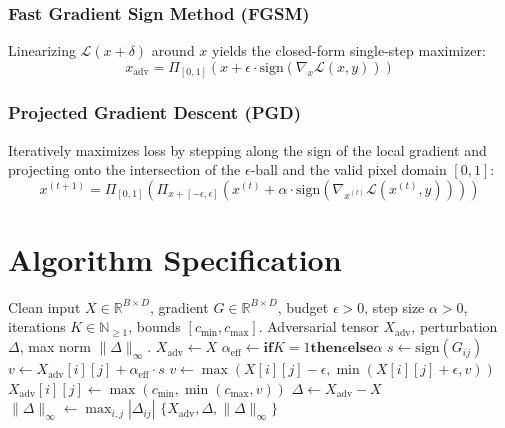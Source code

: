 \documentclass[11pt,a4paper]{article}
\theoremstyle{definition}
\begin{document}
\subsubsection{Fast Gradient Sign Method (FGSM)}
Linearizing $\mathcal{L}(x + \delta)$ around $x$ yields the closed-form single-step maximizer:
\begin{equation}
x_{\text{adv}} = \Pi_{[0, 1]} \left( x + \epsilon \cdot \text{sign}(\nabla_x \mathcal{L}(x, y)) \right)
\end{equation}

\subsubsection{Projected Gradient Descent (PGD)}
Iteratively maximizes loss by stepping along the sign of the local gradient and projecting onto the intersection of the $\epsilon$-ball and the valid pixel domain $[0, 1]$:
\begin{equation}
x^{(t+1)} = \Pi_{[0, 1]} \left( \Pi_{x + [-\epsilon, \epsilon]} \left( x^{(t)} + \alpha \cdot \text{sign}(\nabla_{x^{(t)}} \mathcal{L}(x^{(t)}, y)) \right) \right)
\end{equation}

\section{Algorithm Specification}

\begin{algorithm}[H]
\caption{Iterative Projected Gradient Descent (PGD / FGSM)}
\label{alg:pgd_fgsm}
\begin{algorithmic}[1]
\Require Clean input $X \in \mathbb{R}^{B \times D}$, gradient $G \in \mathbb{R}^{B \times D}$, budget $\epsilon > 0$, step size $\alpha > 0$, iterations $K \in \mathbb{N}_{\ge 1}$, bounds $[c_{\text{min}}, c_{\text{max}}]$.
\Ensure Adversarial tensor $X_{\text{adv}}$, perturbation $\Delta$, max norm $\|\Delta\|_\infty$.
\State $X_{\text{adv}} \gets X$
\State $\alpha_{\text{eff}} \gets \mathbf{if } K = 1 \mathbf{ then } \epsilon \mathbf{ else } \alpha$
            \State $s \gets \text{sign}(G_{ij})$
            \State $v \gets X_{\text{adv}}[i][j] + \alpha_{\text{eff}} \cdot s$
            \State $v \gets \max(X[i][j] - \epsilon, \min(X[i][j] + \epsilon, v))$ 
            \State $X_{\text{adv}}[i][j] \gets \max(c_{\text{min}}, \min(c_{\text{max}}, v))$ 
        \EndFor
    \EndFor
\EndFor
\State $\Delta \gets X_{\text{adv}} - X$
\State $\|\Delta\|_\infty \gets \max_{i, j} |\Delta_{ij}|$
\State \Return $\{X_{\text{adv}}, \Delta, \|\Delta\|_\infty\}$
\end{algorithmic}
\end{algorithm}
\end{document}
